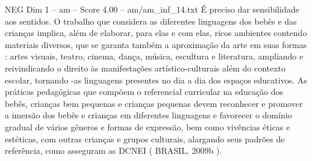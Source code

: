 \begin{textsample}{NEG Dim 1 – am – Score 4.00 – am/am\_inf\_14.txt}
É preciso dar sensibilidade aos sentidos.
O trabalho que considera as diferentes linguagens dos bebês e das crianças implica, além de elaborar, para elas e com elas, ricos ambientes contendo materiais diversos, que se garanta também a aproximação da arte em suas formas : artes visuais, teatro, cinema, dança, música, escultura e literatura, ampliando e reivindicando o direito às manifestações artístico-culturais além do contexto escolar, tornando -as linguagens presentes no dia a dia dos espaços educativos.
As práticas pedagógicas que compõem o referencial curricular na educação dos bebês, crianças bem pequenas e crianças pequenas devem reconhecer e promover a imersão dos bebês e crianças em diferentes linguagens e favorecer o domínio gradual de vários gêneros e formas de expressão, bem como vivências éticas e estéticas, com outras crianças e grupos culturais, alargando seus padrões de referência, como asseguram as DCNEI ( BRASIL, 2009b ).

\end{textsample}
